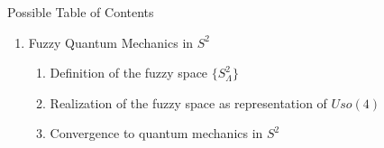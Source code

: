 \begin{frame}{Possible Table of Contents}
\begin{enumerate}
\begin{enumerate}
\begin{enumerate}
            
            \item Realization of the fuzzy space as representation of $Uso(3)$
            
            \item Convergence to quantum mechanics in $S^1$
            
            \end{enumerate}
        
        \item Fuzzy Quantum Mechanics in $S^2$
            
            \begin{enumerate}\tiny
                
            \item Definition of the fuzzy space $\{S^2_\Lambda\}$
            
            
            \item Realization of the fuzzy space as representation of $Uso(4)$
            
            \item Convergence to quantum mechanics in $S^2$
            
            \end{enumerate}
            
        \end{enumerate}
    
    \end{enumerate}
\end{frame}

